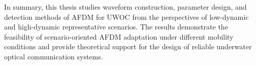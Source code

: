 \begin{abstractEn}
  In summary, this thesis studies waveform construction, parameter design, and detection methods of AFDM for UWOC from the perspectives of low-dynamic and high-dynamic representative scenarios. The results demonstrate the feasibility of scenario-oriented AFDM adaptation under different mobility conditions and provide theoretical support for the design of reliable underwater optical communication systems.
\end{abstractEn}
